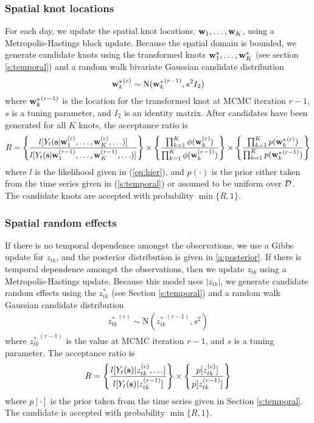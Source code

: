 \documentclass[11pt]{article}
\begin{document}
\subsubsection*{Spatial knot locations}
For each day, we update the spatial knot locations, $\mbox{\bf w}_1, \ldots, \mbox{\bf w}_K$, using a Metropolis-Hastings block update.
Because the spatial domain is bounded, we generate candidate knots using the transformed knots $\mbox{\bf w}^*_1, \ldots, \mbox{\bf w}^*_K$ (see section \ref{s:temporal}) and a random walk bivariate Gaussian candidate distribution
\begin{align*}
	{ \mbox{\bf w}^*_k}^{(c)} \sim \text{N}({\mbox{\bf w}^*_k}^{(r - 1)}, s^2 I_2)
\end{align*}
where ${\mbox{\bf w}^*_k}^{(r - 1)}$ is the location for the transformed knot at MCMC iteration $r - 1$, $s$ is a tuning parameter, and $I_2$ is an identity matrix.
After candidates have been generated for all $K$ knots, the acceptance ratio is
\begin{align*}
  R = \left\{ \frac{ l[ Y_t(\mbox{\bf s} | \mbox{\bf w}_1^{(c)}, \ldots, \mbox{\bf w}_K^{(c)}, \ldots)] }{l[ Y_t(\mbox{\bf s} | \mbox{\bf w}_1^{(r - 1)}, \ldots, \mbox{\bf w}_K^{(r - 1)}, \ldots)]} \right\} \times \left\{ \frac{ \prod_{k = 1}^{K}\phi(\mbox{\bf w}_k^{(c)})}{ \prod_{k = 1}^{K}\phi(\mbox{\bf w}_k^{(r - 1)})} \right\} \times \left\{ \frac{ \prod_{k = 1}^{K} p({\mbox{\bf w}^*_k}^{(c)})}{ \prod_{k = 1}^{K} p({\mbox{\bf w}^*_k}^{(r - 1)})}\right\}
\end{align*}
where $l$ is the likelihood given in (\ref{eq:hier}), and $p(\cdot)$ is the prior either taken from the time series given in (\ref{s:temporal}) or assumed to be uniform over ${\cal D}$.
The candidate knots are accepted with probability $\min\{R, 1\}$.

\subsubsection*{Spatial random effects}
If there is no temporal dependence amongst the observations, we use a Gibbs update for $z_{tk}$, and the posterior distribution is given in \ref{a:posterior}.
If there is temporal dependence amongst the observations, then we update $z_{tk}$ using a Metropolis-Hastings update.
Because this model uses $|z_{tk}|$, we generate candidate random effects using the $z^*_{tk}$ (see Section \ref{s:temporal}) and a random walk Gaussian candidate distribution
\begin{align*}
  {z^*_{tk}}^{(c)} \sim \text{N}({z^*_{tk}}^{(r - 1)}, s^2)
\end{align*}
where ${z^*_{tk}}^{(r-1)}$ is the value at MCMC iteration $r - 1$, and $s$ is a tuning parameter.
The acceptance ratio is
\begin{align*}
  R = \left\{ \frac{ l[Y_t(\mbox{\bf s}) | z_{tk}^{(c)}, \ldots] }{ l[Y_t(\mbox{\bf s}) | z_{tk}^{(r - 1)}]} \right\} \times \left\{ \frac{ p[ z_{tk}^{(c)} ] }{ p[ z_{tk}^{(r - 1)}]}\right\}
\end{align*}
where $p[\cdot]$ is the prior taken from the time series given in Section \ref{s:temporal}.
The candidate is accepted with probability $\min\{R, 1\}$.
\end{document}
